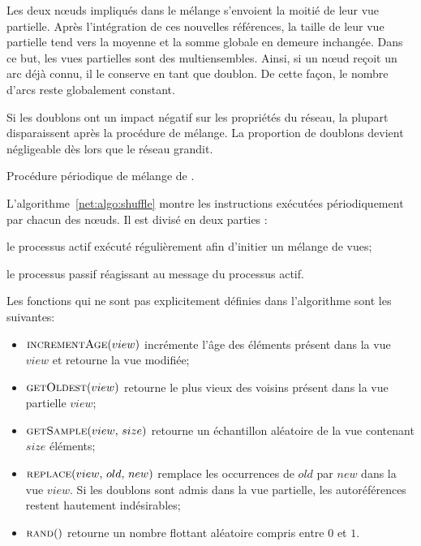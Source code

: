 Les deux nœuds impliqués dans le mélange s'envoient la moitié de leur vue
partielle. Après l'intégration de ces nouvelles références, la taille de leur
vue partielle tend vers la moyenne et la somme globale en demeure
inchangée. Dans ce but, les vues partielles sont des multiensembles. Ainsi, si
un nœud reçoit un arc déjà connu, il le conserve en tant que doublon.  De cette
façon, le nombre d'arcs reste globalement constant.

Si les doublons ont un impact négatif sur les propriétés du réseau, la plupart
disparaissent après la procédure de mélange. La proportion de doublons devient
négligeable dès lors que le réseau grandit.

\begin{algorithm}[h]
  
  \caption[Procédure périodique de mélange de \SPRAY]
  {\label{net:algo:shuffle}Procédure périodique de mélange de \SPRAY.}
\end{algorithm}

L'algorithme~\ref{net:algo:shuffle} montre les instructions exécutées
périodiquement par chacun des nœuds. Il est divisé en deux parties :
\begin{inparaenum}[(i)]
\item le processus actif exécuté régulièrement afin d'initier un mélange de vues;
\item le processus passif réagissant au message du processus actif.
\end{inparaenum}

\noindent Les fonctions qui ne sont pas explicitement définies dans l'algorithme
sont les suivantes:
\begin{itemize}
\item $\textsc{incrementAge}(view)$ incrémente l'âge des éléments présent
  dans la vue $view$ et retourne la vue modifiée;
\item $\textsc{getOldest}(view)$ retourne le plus vieux des voisins présent
  dans la vue partielle $view$;
\item $\textsc{getSample}(view,\, size)$ retourne un échantillon aléatoire de la
  vue contenant $size$ éléments;
\item $\textsc{replace}(view,\,old,\,new)$ remplace les occurrences de $old$
  par $new$ dans la vue $view$. Si les doublons sont admis dans la vue
  partielle, les autoréférences restent hautement indésirables;
\item $\textsc{rand}()$ retourne un nombre flottant aléatoire compris entre $0$
  et $1$.
\end{itemize}

